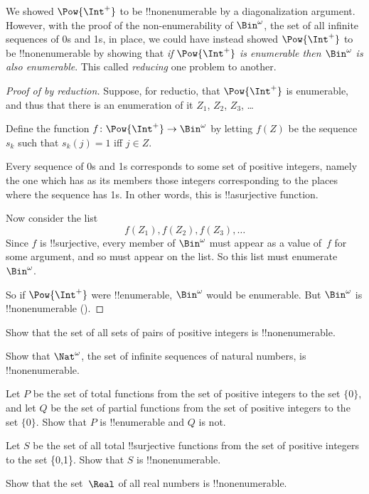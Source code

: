 \documentclass[../../../include/open-logic-section]{subfiles}
\begin{document}


We showed $\Pow{\Int^+}$ to be !!{nonenumerable} by a diagonalization
argument. However, with the proof of the non-enumerability of
$\Bin^\omega$, the set of all infinite sequences of 0s and 1s, in
place, we could have instead showed $\Pow{\Int^+}$ to be
!!{nonenumerable} by showing that \emph{if $\Pow{\Int^+}$ is
  enumerable then $\Bin^\omega$ is also enumerable}. This called
\emph{reducing} one problem to another.

\begin{proof}[Proof of {} by reduction]
Suppose, for reductio, that $\Pow{\Int^+}$ is enumerable, and thus that
there is an enumeration of it $Z_{1}$, $Z_{2}$, $Z_{3}$, \dots

Define the function $f \colon \Pow{\Int^+} \to \Bin^\omega$ by letting
$f(Z)$ be the sequence $s_{k}$ such that $s_{k}(j) = 1$ iff $j \in Z$.

Every sequence of 0s and 1s corresponds to some set of positive
integers, namely the one which has as its members those integers
corresponding to the places where the sequence has 1s. In other
words, this is !!a{surjective} function.

Now consider the list
\[
f(Z_1), f(Z_2), f(Z_3), \dots
\]
Since $f$ is !!{surjective}, every member of $\Bin^\omega$ must
appear as a value of~$f$ for some argument, and so must appear on the
list. So this list must enumerate~$\Bin^\omega$.

So if $\Pow{\Int^+}$ were !!{enumerable}, $\Bin^\omega$ would be enumerable.
But $\Bin^\omega$ is !!{nonenumerable} ().
\end{proof}

\begin{prob}
Show that the set of all sets of pairs of positive integers is
!!{nonenumerable}.
\end{prob}

\begin{prob}
Show that $\Nat^\omega$, the set of infinite sequences of
natural numbers, is !!{nonenumerable}.
\end{prob}

\begin{prob}
Let $P$ be the set of total functions from the set of positive
integers to the set $\{0\}$, and let $Q$ be the set of partial
functions from the set of positive integers to the set $\{0\}$. Show
that $P$ is !!{enumerable} and $Q$ is not.
\end{prob}

\begin{prob}
Let $S$ be the set of all total !!{surjective} functions from the set
of positive integers to the set \{0,1\}. Show that $S$ is
!!{nonenumerable}.
\end{prob}

\begin{prob}
Show that the set~$\Real$ of all real numbers is !!{nonenumerable}.
\end{prob}
\end{document}
